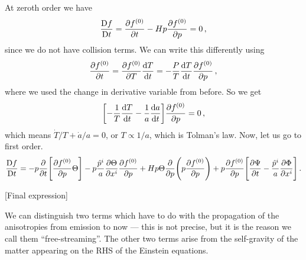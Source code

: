 \documentclass[main.tex]{subfiles}
\begin{document}
At zeroth order we have 
%
\begin{align}
\frac{\mathrm{D}f}{\mathrm{D}t} = \pdv{f^{(0)}}{t}
- Hp \pdv{f^{(0)}}{p} =0
\,,
\end{align}
%
since we do not have collision terms. We can write this differently using 
%
\begin{align}
\pdv{f^{(0)}}{t} = \pdv{f^{(0)}}{T} \dv{T}{t} = - \frac{P}{T} \dv{T}{t} \pdv{f^{(0)}}{p}
\,,
\end{align}
%
where we used the change in derivative variable from before. So we get 
%
\begin{align}
\qty[- \frac{1}{T} \dv{T}{t} - \frac{1}{a} \dv{a}{t}] \pdv{f^{(0)}}{p} =0
\,,
\end{align}
%
which means \(\dot{T} / T + \dot{a} / a = 0\), or \(T \propto 1/a\), which is Tolman's law. Now, let us go to first order. 
%
\begin{align}
\bigd{f}{t}
= -p \pdv{}{t} \qty[\pdv{f^{(0)}}{p} \Theta ] - p \frac{\hat{p}^{i}}{a} \pdv{\Theta }{x^{i}} \pdv{f^{(0)}}{p}
+ H p \Theta  \pdv{}{p} \qty(p \pdv{f^{(0)}}{p}) 
+ p \pdv{f^{(0)}}{p} \qty[\pdv{\Psi }{t} - \frac{\hat{p}^{i}}{a} \pdv{\Phi }{x^{i}}]
\,.
\end{align}

[Final expression]

We can distinguish two terms which have to do with the propagation of the anisotropies from emission to now --- this is not precise, but it is the reason we call them ``free-streaming''. 
The other two terms arise from the self-gravity of the matter appearing on the RHS of the Einstein equations. 
\end{document}
